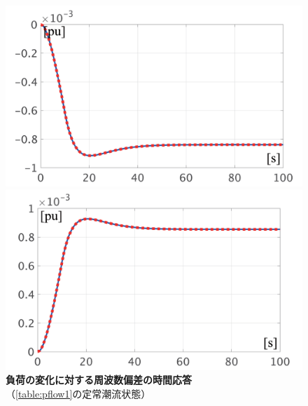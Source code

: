 \documentclass[tombow,dvipdfmx]{corona-a5-1.1}
\begin{document}
\begin{figure}[t]
  \centering
  {
  \begin{minipage}{0.49\linewidth}
    \centering
    \includegraphics[width = 1.0\linewidth]{figs/P1mi}
  \end{minipage}
  \begin{minipage}{0.49\linewidth}
    \centering
    \includegraphics[width = 1.0\linewidth]{figs/P1pl}
  \end{minipage}
  \medskip
  \caption{\textbf{負荷の変化に対する周波数偏差の時間応答}
  \\ \centering（\ref{table:pflow1}の定常潮流状態）}
  \label{fig:P1load}
  }
\medskip
\end{figure}
\end{document}
